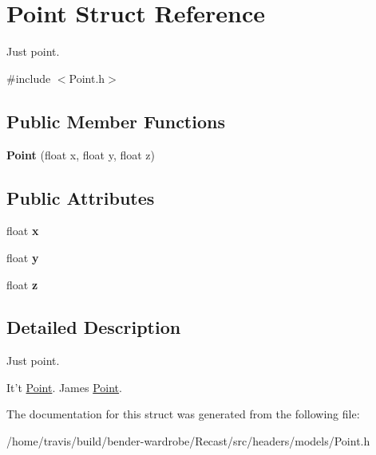 \hypertarget{struct_point}{\section{Point Struct Reference}
\label{struct_point}
}


Just point.  




{\ttfamily \#include $<$Point.\-h$>$}

\subsection*{Public Member Functions}
\begin{DoxyCompactItemize}
\item 
\hypertarget{struct_point_a405838cb39b8fb6119633d9ba7e6b4fb}{{\bfseries Point} (float x, float y, float z)}\label{struct_point_a405838cb39b8fb6119633d9ba7e6b4fb}

\end{DoxyCompactItemize}
\subsection*{Public Attributes}
\begin{DoxyCompactItemize}
\item 
\hypertarget{struct_point_a05dfe2dfbde813ad234b514f30e662f1}{float {\bfseries x}}\label{struct_point_a05dfe2dfbde813ad234b514f30e662f1}

\item 
\hypertarget{struct_point_a6101960c8d2d4e8ea1d32c9234bbeb8d}{float {\bfseries y}}\label{struct_point_a6101960c8d2d4e8ea1d32c9234bbeb8d}

\item 
\hypertarget{struct_point_a9a666531e0e99adff132be93d2407d0c}{float {\bfseries z}}\label{struct_point_a9a666531e0e99adff132be93d2407d0c}

\end{DoxyCompactItemize}


\subsection{Detailed Description}
Just point. 

It't \hyperlink{struct_point}{Point}. James \hyperlink{struct_point}{Point}. 

The documentation for this struct was generated from the following file\-:\begin{DoxyCompactItemize}
\item 
/home/travis/build/bender-\/wardrobe/\-Recast/src/headers/models/Point.\-h\end{DoxyCompactItemize}
